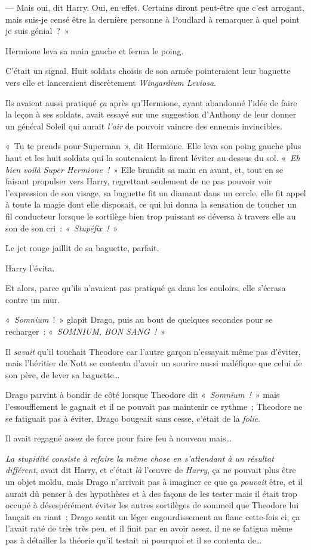 --- Mais oui, dit Harry.
Oui, en effet.
Certains diront peut-être que c'est arrogant, mais suis-je censé être la dernière personne à Poudlard à remarquer à quel point je suis génial~?~»

Hermione leva sa main gauche et ferma le poing.

C'était un signal.
Huit soldats choisis de son armée pointeraient leur baguette vers elle et lanceraient discrètement \emph{Wingardium Leviosa}.

Ils avaient aussi pratiqué \emph{ça} après qu'Hermione, ayant abandonné l'idée de faire la leçon à ses soldats, avait essayé sur une suggestion d'Anthony de leur donner un général Soleil qui aurait \emph{l'air} de pouvoir vaincre des ennemis invincibles.

«~Tu te prends pour Superman~», dit Hermione.
Elle leva son poing gauche plus haut et les huit soldats qui la soutenaient la firent léviter au-dessus du sol.
«~\emph{Eh bien voilà Super Hermione~!}~» Elle brandit sa main en avant, et, tout en se faisant propulser vers Harry, regrettant seulement de ne pas pouvoir voir l'expression de son visage, sa baguette fit un diamant dans un cercle, elle fit appel à toute la magie dont elle disposait, ce qui lui donna la sensation de toucher un fil conducteur lorsque le sortilège bien trop puissant se déversa à travers elle au son de son cri~: \emph{«~Stupéfix~!}~»

Le jet rouge jaillit de sa baguette, parfait.

Harry l'évita.

Et alors, parce qu'ils n'avaient pas pratiqué ça dans les couloirs, elle s'écrasa contre un mur.

\later

«~\emph{Somnium}~!~»
glapit Drago, puis au bout de quelques secondes pour se recharger~: «~\emph{SOMNIUM, BON SANG~!}~»

Il \emph{savait} qu'il touchait Theodore car l'autre garçon n'essayait même pas d'éviter, mais l'héritier de Nott se contenta d'avoir un sourire aussi maléfique que celui de son père, de lever sa baguette…

Drago parvint à bondir de côté lorsque Theodore dit «~\emph{Somnium~!}~» mais l'essoufflement le gagnait et il ne pouvait pas maintenir ce rythme~; Theodore ne se fatiguait pas à éviter, Drago bougeait sans cesse, c'était de la \emph{folie}.

Il avait regagné assez de force pour faire feu à nouveau mais…

\emph{La stupidité consiste à refaire la même chose en s'attendant à un résultat différent}, avait dit Harry, et c'était \emph{là} l'œuvre de \emph{Harry}, ça ne pouvait plus être un objet moldu, mais Drago n'arrivait pas à imaginer ce que ça \emph{pouvait} être, et il aurait dû penser à des hypothèses et à des façons de les tester mais il était trop occupé à désespérément éviter les autres sortilèges de sommeil que Theodore lui lançait en riant~; Drago sentit un léger engourdissement au flanc cette-fois ci, ça l'avait raté de très très peu, et il finit par en avoir assez, il ne se fatigua même pas à détailler la théorie qu'il testait ni pourquoi et il se contenta de…

